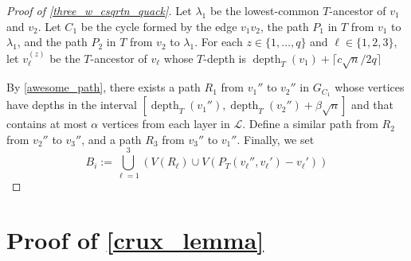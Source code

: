 \documentclass{patmorin}
\DeclareMathOperator{\depth}{depth}
\begin{document}
\begin{proof}[Proof of \cref{three_w_csqrtn_quack}]



  Let $\lambda_1$ be the lowest-common $T$-ancestor of $v_1$ and $v_2$.
  Let $C_1$ be the cycle formed by the edge $v_1v_2$, the path $P_1$ in $T$ from $v_1$ to $\lambda_1$, and the path $P_2$ in $T$ from $v_2$ to $\lambda_1$.  For each $z\in\{1,\ldots,q\}$ and $\ell\in\{1,2,3\}$, let $v_\ell^{(z)}$ be the $T$-ancestor of $v_\ell$ whose $T$-depth is $\depth_T(v_1)+\lceil c\sqrt{n}/2q\rceil$ 




    By \cref{awesome_path}, there exists a path $R_1$ from $v_1''$ to $v_2''$ in  $G_{C_1}$ whose vertices have depths in the interval $[\depth_T(v_1''),\depth_T(v_2'')+\beta\sqrt{n}]$ and that contains at most $\alpha$ vertices from each layer in $\mathcal{L}$.  Define a similar path from $R_2$ from $v_2''$ to $v_3''$, and a path $R_3$ from $v_3''$ to $v_1''$.  Finally, we set
  \[
    B_i := \bigcup_{\ell=1}^3 \left( V(R_\ell)\cup V(P_T(v_\ell'',v_\ell')-v_{\ell}')\right)
  \]
\end{proof}



\section{Proof of \cref{crux_lemma}}
\label{crux_section}




\end{document}
